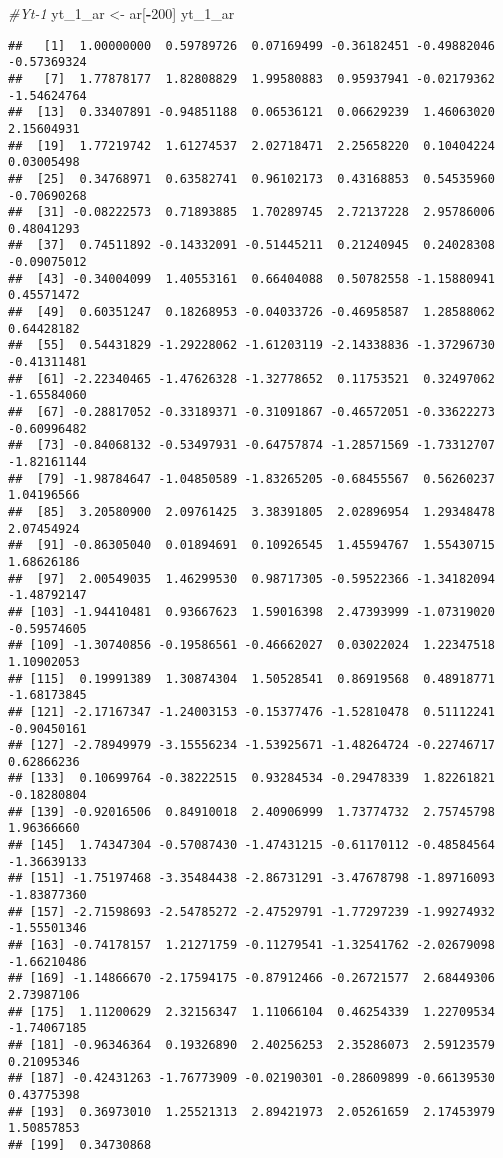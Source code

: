 \documentclass[
]{article}
\newenvironment{Shaded}{\begin{snugshade}}{\end{snugshade}}
\newcommand{\CommentTok}[1]{\textcolor[rgb]{0.56,0.35,0.01}{\textit{#1}}}
\newcommand{\DecValTok}[1]{\textcolor[rgb]{0.00,0.00,0.81}{#1}}
\newcommand{\NormalTok}[1]{#1}
\newcommand{\OtherTok}[1]{\textcolor[rgb]{0.56,0.35,0.01}{#1}}
\newcommand{\SpecialCharTok}[1]{\textcolor[rgb]{0.81,0.36,0.00}{\textbf{#1}}}
\begin{document}
\begin{Shaded}
\begin{Highlighting}[]
\CommentTok{\#Yt{-}1}
\NormalTok{yt\_1\_ar }\OtherTok{\textless{}{-}}\NormalTok{ ar[}\SpecialCharTok{{-}}\DecValTok{200}\NormalTok{]}
\NormalTok{yt\_1\_ar}
\end{Highlighting}
\end{Shaded}

\begin{verbatim}
##   [1]  1.00000000  0.59789726  0.07169499 -0.36182451 -0.49882046 -0.57369324
##   [7]  1.77878177  1.82808829  1.99580883  0.95937941 -0.02179362 -1.54624764
##  [13]  0.33407891 -0.94851188  0.06536121  0.06629239  1.46063020  2.15604931
##  [19]  1.77219742  1.61274537  2.02718471  2.25658220  0.10404224  0.03005498
##  [25]  0.34768971  0.63582741  0.96102173  0.43168853  0.54535960 -0.70690268
##  [31] -0.08222573  0.71893885  1.70289745  2.72137228  2.95786006  0.48041293
##  [37]  0.74511892 -0.14332091 -0.51445211  0.21240945  0.24028308 -0.09075012
##  [43] -0.34004099  1.40553161  0.66404088  0.50782558 -1.15880941  0.45571472
##  [49]  0.60351247  0.18268953 -0.04033726 -0.46958587  1.28588062  0.64428182
##  [55]  0.54431829 -1.29228062 -1.61203119 -2.14338836 -1.37296730 -0.41311481
##  [61] -2.22340465 -1.47626328 -1.32778652  0.11753521  0.32497062 -1.65584060
##  [67] -0.28817052 -0.33189371 -0.31091867 -0.46572051 -0.33622273 -0.60996482
##  [73] -0.84068132 -0.53497931 -0.64757874 -1.28571569 -1.73312707 -1.82161144
##  [79] -1.98784647 -1.04850589 -1.83265205 -0.68455567  0.56260237  1.04196566
##  [85]  3.20580900  2.09761425  3.38391805  2.02896954  1.29348478  2.07454924
##  [91] -0.86305040  0.01894691  0.10926545  1.45594767  1.55430715  1.68626186
##  [97]  2.00549035  1.46299530  0.98717305 -0.59522366 -1.34182094 -1.48792147
## [103] -1.94410481  0.93667623  1.59016398  2.47393999 -1.07319020 -0.59574605
## [109] -1.30740856 -0.19586561 -0.46662027  0.03022024  1.22347518  1.10902053
## [115]  0.19991389  1.30874304  1.50528541  0.86919568  0.48918771 -1.68173845
## [121] -2.17167347 -1.24003153 -0.15377476 -1.52810478  0.51112241 -0.90450161
## [127] -2.78949979 -3.15556234 -1.53925671 -1.48264724 -0.22746717  0.62866236
## [133]  0.10699764 -0.38222515  0.93284534 -0.29478339  1.82261821 -0.18280804
## [139] -0.92016506  0.84910018  2.40906999  1.73774732  2.75745798  1.96366660
## [145]  1.74347304 -0.57087430 -1.47431215 -0.61170112 -0.48584564 -1.36639133
## [151] -1.75197468 -3.35484438 -2.86731291 -3.47678798 -1.89716093 -1.83877360
## [157] -2.71598693 -2.54785272 -2.47529791 -1.77297239 -1.99274932 -1.55501346
## [163] -0.74178157  1.21271759 -0.11279541 -1.32541762 -2.02679098 -1.66210486
## [169] -1.14866670 -2.17594175 -0.87912466 -0.26721577  2.68449306  2.73987106
## [175]  1.11200629  2.32156347  1.11066104  0.46254339  1.22709534 -1.74067185
## [181] -0.96346364  0.19326890  2.40256253  2.35286073  2.59123579  0.21095346
## [187] -0.42431263 -1.76773909 -0.02190301 -0.28609899 -0.66139530  0.43775398
## [193]  0.36973010  1.25521313  2.89421973  2.05261659  2.17453979  1.50857853
## [199]  0.34730868
\end{verbatim}
\end{document}
